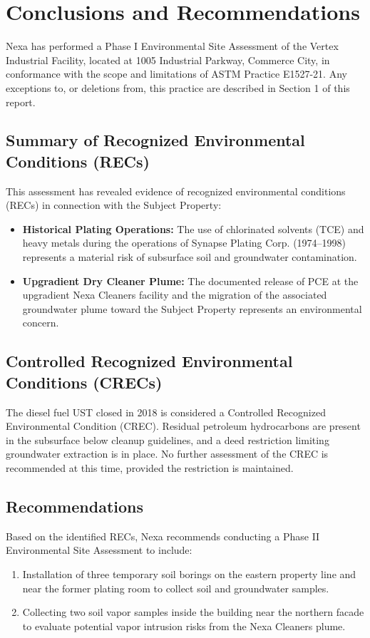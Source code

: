 \section{Conclusions and Recommendations}

Nexa has performed a Phase I Environmental Site Assessment of the Vertex Industrial Facility, located at 1005 Industrial Parkway, Commerce City, in conformance with the scope and limitations of ASTM Practice E1527-21. Any exceptions to, or deletions from, this practice are described in Section 1 of this report.

\subsection{Summary of Recognized Environmental Conditions (RECs)}
This assessment has revealed evidence of recognized environmental conditions (RECs) in connection with the Subject Property:
\begin{itemize}
  \item \textbf{Historical Plating Operations:} The use of chlorinated solvents (TCE) and heavy metals during the operations of Synapse Plating Corp. (1974--1998) represents a material risk of subsurface soil and groundwater contamination.
  \item \textbf{Upgradient Dry Cleaner Plume:} The documented release of PCE at the upgradient Nexa Cleaners facility and the migration of the associated groundwater plume toward the Subject Property represents an environmental concern.
\end{itemize}

\subsection{Controlled Recognized Environmental Conditions (CRECs)}
The diesel fuel UST closed in 2018 is considered a Controlled Recognized Environmental Condition (CREC). Residual petroleum hydrocarbons are present in the subsurface below cleanup guidelines, and a deed restriction limiting groundwater extraction is in place. No further assessment of the CREC is recommended at this time, provided the restriction is maintained.

\subsection{Recommendations}
Based on the identified RECs, Nexa recommends conducting a Phase II Environmental Site Assessment to include:
\begin{enumerate}
  \item Installation of three temporary soil borings on the eastern property line and near the former plating room to collect soil and groundwater samples.
  \item Collecting two soil vapor samples inside the building near the northern facade to evaluate potential vapor intrusion risks from the Nexa Cleaners plume.
\end{enumerate}

